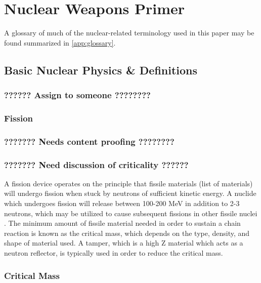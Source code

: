 \documentclass{report}
\begin{document}
\chapter{Nuclear Weapons Primer}

A glossary of much of the nuclear-related terminology used in this paper may be found summarized in  \autoref{app:glossary}.

\section{Basic Nuclear Physics \& Definitions}

\subsection{??????   Assign to someone  ????????}

\subsection{Fission}

\subsection{???????  Needs content proofing   ????????}

\subsection{???????   Need discussion of criticality  ??????}

A fission device operates on the principle that fissile materials (list of materials) will undergo fission when stuck by neutrons of sufficient kinetic energy. A nuclide which undergoes fission will release between 100-200 MeV in addition to 2-3 neutrons, which may be utilized to cause subsequent fissions in other fissile nuclei \cite{krane1987introductory}. The minimum amount of fissile material needed in order to sustain a chain reaction is known as the critical mass, which depends on the type, density, and shape of material used. A tamper, which is a high Z material which acts as a neutron reflector, is typically used in order to reduce the critical mass. 












\subsection{Critical Mass}
\end{document}
